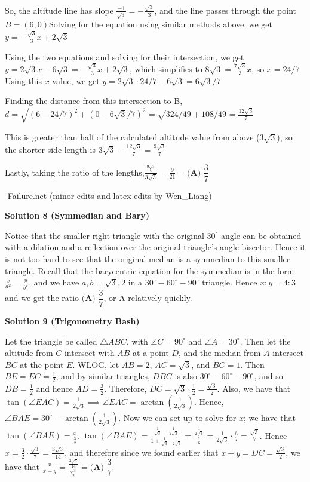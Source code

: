 \begin{enumerate}
 So, the altitude line has slope $\frac{-1}{\sqrt{3}}=-\frac{\sqrt{3}}{3}$, and the line passes through the point $B = (6,0)$Solving for the equation using similar methods above, we get $y=-\frac{\sqrt{3}}{3}x+2\sqrt{3}$

 Using the two equations and solving for their intersection, we get $y=2\sqrt{3}x-6\sqrt3=-\frac{\sqrt{3}}{3}x+2\sqrt{3}$, which simplifies to $8\sqrt3=\frac{7\sqrt{3}}{3}x$, so $x=24/7$Using this $x$ value, we get $y=2\sqrt{3}\cdot24/7-6\sqrt{3}=6\sqrt{3}/7$

 Finding the distance from this intersection to B, $d=\sqrt{(6-24/7)^2+(0-6\sqrt{3}/7)^2} = \sqrt{324/49+108/49}=\frac{12\sqrt{3}}{7}$

 This is greater than half of the calculated altitude value from above ($3\sqrt{3}$), so the shorter side length is $3\sqrt{3}-\frac{12\sqrt{3}}{7}=\frac{9\sqrt{3}}{7}$

 Lastly, taking the ratio of the lengths,$\frac{\frac{9\sqrt{3}}{7}}{3\sqrt{3}}=\frac{9}{21}=\boxed{\textbf{(A) } \dfrac{3}{7}}$

 -Failure.net (minor edits and latex edits by Wen\_Liang)

 



\textbf{Solution 8 (Symmedian and Bary)}

Notice that the smaller right triangle with the original $30^\circ$ angle can be obtained with a dilation and a reflection over the original triangle’s angle bisector. Hence it is not too hard to see that the original median is a symmedian to this smaller triangle. Recall that the barycentric equation for the symmedian is in the form $\frac x{a^2}=\frac y{b^2}$, and we have $a,b=\sqrt3,2$ in a $30^\circ-60^\circ-90^\circ$ triangle. Hence $x:y=4:3$ and we get the ratio $\textbf{(A) } \dfrac{3}{7}$, or A relatively quickly.

 



\textbf{Solution 9 (Trigonometry Bash)}

Let the triangle be called $\triangle ABC$, with $\angle C=90^{\circ}$ and $\angle A=30^{\circ}$. Then let the altitude from $C$ intersect with $AB$ at a point $D$, and the median from $A$ intersect $BC$ at the point $E$. WLOG, let $AB=2$, $AC=\sqrt{3}$, and $BC=1$. Then $BE=EC=\frac12$, and by similar triangles, $DBC$ is also $30^{\circ}{-}60^{\circ}{-}90^{\circ}$, and so $DB=\frac12$ and hence $AD=\frac32$. Therefore, $DC=\sqrt{3}\cdot\frac12=\frac{\sqrt{3}}2$. Also, we have that $\tan(\angle EAC)=\frac1{2\sqrt{3}}\implies\angle EAC=\arctan\left(\frac1{2\sqrt{3}}\right)$. Hence, $\angle BAE=30^{\circ}-\arctan\left(\frac1{2\sqrt{3}}\right)$. Now we can set up to solve for $x$; we have that $\tan(\angle BAE)=\frac{x}{\frac32}$. $\tan(\angle BAE)=\frac{\frac1{\sqrt{3}}-\frac1{2\sqrt{3}}}{1+\frac1{\sqrt{3}}\cdot\frac1{2\sqrt{3}}}=\frac{\frac1{2\sqrt{3}}}{\frac76}=\frac1{2\sqrt{3}}\cdot\frac67=\frac{\sqrt{3}}7$. Hence $x=\frac32\cdot\frac{\sqrt{3}}7=\frac{3\sqrt{3}}{14}$, and therefore since we found earlier that $x+y=DC=\frac{\sqrt{3}}2$, we have that $\frac{x}{x+y}=\frac{\frac{3\sqrt{3}}{14}}{\frac{\sqrt{3}}2}=\boxed{\textbf{(A) } \dfrac{3}{7}}$.


\end{enumerate}
